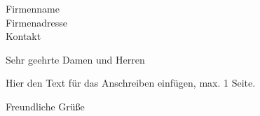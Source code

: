 \documentclass[
parskip=half,
fontsize=11pt, %
twoside=off, %
version=last,
foldmarks=false,
fromalign=left, %
fromrule=true,
frommobilephone,
fromemail,
fromlogo, %
subject=titled,
backaddress=false,
]    
{scrlttr2}
\newcommand{\address}{
Firmenname    \\
Firmenadresse \\
Kontakt       \\
}
\begin{document}
\begin{letter}{\address}
	\opening{Sehr geehrte Damen und Herren}

	Hier den Text für das Anschreiben einfügen, max. 1 Seite.
	\closing{Freundliche Grüße}


\end{letter}
\end{document}
